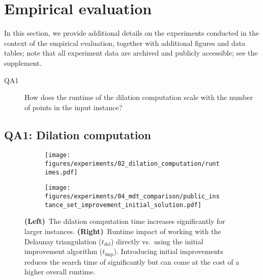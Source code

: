\section{Empirical evaluation}

In this section, we provide additional details on the experiments conducted in the context of the empirical evaluation,
together with additional figures and data tables; 
note that all experiment data are archived and publicly accessible; see the supplement.

\begin{description}
    \item[QA1] How does the runtime of the dilation computation scale with the number of points in the input instance?
\end{description}

\subsection{QA1: Dilation computation}
\label{sec:experiments-dilation-computation}

\begin{figure}
    \begin{subfigure}[t]{0.49\linewidth}
        \centering
        \texttt{[image: figures/experiments/02\_dilation\_computation/runtimes.pdf]}
    \end{subfigure}\hfill
    \begin{subfigure}[t]{0.49\linewidth}
        \centering
        \texttt{[image: figures/experiments/04\_mdt\_comparison/public\_instance\_set\_improvement\_initial\_solution.pdf]}
    \end{subfigure}
    \caption{\textbf{(Left)}~The dilation computation time increases significantly for larger instances. 
             \textbf{(Right)}~Runtime impact of working with the Delaunay triangulation ($t_{\operatorname{del}}$) directly vs.~using the initial improvement algorithm ($t_{\operatorname{imp}}$).
                     Introducing initial improvements reduces the search time of \binmdt{} significantly but can come at the cost of a higher overall runtime.}
    \label{fig:dilation-computation}
    \label{fig:initial-improvement}
\end{figure}

